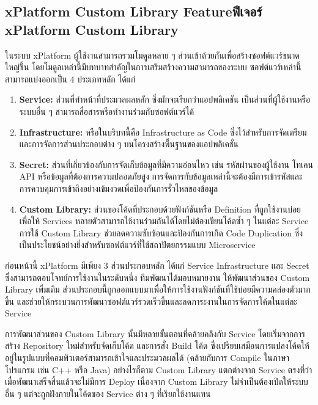 \subsection{\ifenglish xPlatform Custom Library Feature\else ฟีเจอร์ xPlatform Custom Library \fi}
ในระบบ xPlatform ผู้ใช้งานสามารถรวมโมดูลหลาย ๆ ส่วนเข้าด้วยกันเพื่อสร้างซอฟต์แวร์ขนาดใหญ่ขึ้น โดยโมดูลเหล่านี้มีบทบาทสำคัญในการเสริมสร้างความสามารถของระบบ ซอฟต์แวร์เหล่านี้สามารถแบ่งออกเป็น 4 ประเภทหลัก ได้แก่
\begin{enumerate} 
    \item \textbf{Service: } ส่วนที่ทำหน้าที่ประมวลผลหลัก ซึ่งมักจะเรียกว่าแอปพลิเคชัน  เป็นส่วนที่ผู้ใช้งานหรือระบบอื่น ๆ สามารถสื่อสารหรือทำงานร่วมกับซอฟต์แวร์ได้
    \item \textbf{Infrastructure: } หรือในบริบทนี้คือ Infrastructure as Code ซึ่งไว้สำหรับการจัดเตรียมและการจัดการส่วนประกอบต่าง ๆ บนโครงสร้างพื้นฐานของแอปพลิเคชั่น
    \item \textbf{Secret: } ส่วนที่เกี่ยวข้องกับการจัดเก็บข้อมูลที่มีความอ่อนไหว เช่น รหัสผ่านของผู้ใช้งาน โทเคน API หรือข้อมูลที่ต้องการความปลอดภัยสูง การจัดการกับข้อมูลเหล่านี้จะต้องมีการเข้ารหัสและการควบคุมการเข้าถึงอย่างเข้มงวดเพื่อป้องกันการรั่วไหลของข้อมูล 
    \item \textbf{Custom Library: } ส่วนของโค้ดที่ประกอบด้วยฟังก์ชันหรือ Definition ที่ถูกใช้งานบ่อย เพื่อให้ Services หลายตัวสามารถใช้งานร่วมกันได้โดยไม่ต้องเขียนโค้ดซ้ำ ๆ ในแต่ละ Service การใช้ Custom Library ช่วยลดความซับซ้อนและป้องกันการเกิด Code Duplication ซึ่งเป็นประโยชน์อย่างยิ่งสำหรับซอฟต์แวร์ที่ใช้สถาปัตยกรรมแบบ Microservice 
\end{enumerate}

ก่อนหน้านี้ xPlatform มีเพียง 3 ส่วนประกอบหลัก ได้แก่ Service Infrastructure และ Secret ซึ่งสามารถตอบโจทย์การใช้งานในระดับหนึ่ง ทีมพัฒนาได้มอบหมายงาน  ให้พัฒนาส่วนของ Custom Library เพิ่มเติม ส่วนประกอบนี้ถูกออกแบบมาเพื่อให้การใช้งานฟังก์ชันที่ใช้บ่อยมีความคล่องตัวมากขึ้น และช่วยให้กระบวนการพัฒนาซอฟต์แวร์รวดเร็วขึ้นและลดภาระงานในการจัดการโค้ดในแต่ละ Service

การพัฒนาส่วนของ Custom Library นั้นมีหลายขั้นตอนที่คล้ายคลึงกับ Service โดยเริ่มจากการสร้าง Repository ใหม่สำหรับจัดเก็บโค้ด และการสั่ง Build โค้ด ซึ่งเปรียบเสมือนการแปลงโค้ดให้อยู่ในรูปแบบที่คอมพิวเตอร์สามารถเข้าใจและประมวลผลได้ (คล้ายกับการ Compile ในภาษาโปรแกรม เช่น C++ หรือ Java) อย่างไรก็ตาม Custom Library แตกต่างจาก Service ตรงที่ว่าเมื่อพัฒนาเสร็จสิ้นแล้วจะไม่มีการ Deploy เนื่องจาก Custom Library ไม่จำเป็นต้องเปิดให้ระบบอื่น ๆ แต่จะถูกฝังภายในโค้ดของ Service ต่าง ๆ ที่เรียกใช้งานแทน

